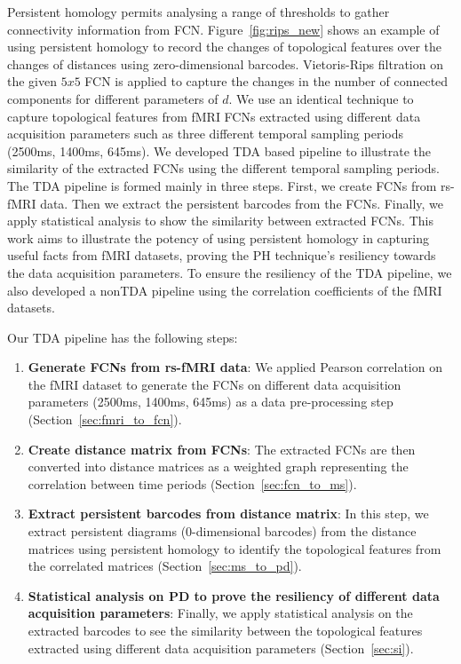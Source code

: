Persistent homology permits analysing a range of thresholds to gather connectivity information from FCN. Figure~\ref{fig:rips_new} shows an example of using persistent homology to record the changes of topological features over the changes of distances using zero-dimensional barcodes. Vietoris-Rips filtration on the given $5 x 5$ FCN is applied to capture the changes in the number of connected components for different parameters of $d$. We use an identical technique to capture topological features from fMRI FCNs extracted using different data acquisition parameters such as three different temporal sampling periods (2500ms, 1400ms, 645ms). We developed TDA based pipeline to illustrate the similarity of the extracted FCNs using the different temporal sampling periods. The TDA pipeline is formed mainly in three steps. First, we create FCNs from rs-fMRI data. Then we extract the persistent barcodes from the FCNs. Finally, we apply statistical analysis to show the similarity between extracted FCNs. This work aims to illustrate the potency of using persistent homology in capturing useful facts from fMRI datasets, proving the PH technique's resiliency towards the data acquisition parameters. To ensure the resiliency of the TDA pipeline, we also developed a nonTDA pipeline using the correlation coefficients of the fMRI datasets. 

Our TDA pipeline has the following steps:

\begin{enumerate}
    \item \textbf{Generate FCNs from rs-fMRI data}: We applied Pearson correlation on the fMRI dataset to generate the FCNs on different data acquisition parameters (2500ms, 1400ms, 645ms) as a data pre-processing step (Section~\ref{sec:fmri_to_fcn}).
    \item \textbf{Create distance matrix from FCNs}: The extracted FCNs are then converted into distance matrices as a weighted graph representing the correlation between time periods (Section~\ref{sec:fcn_to_ms}).
    \item \textbf{Extract persistent barcodes from distance matrix}: In this step, we extract persistent diagrams (0-dimensional barcodes) from the distance matrices using persistent homology to identify the topological features from the correlated matrices (Section~\ref{sec:ms_to_pd}).
    \item \textbf{Statistical analysis on PD to prove the resiliency of different data acquisition parameters}: Finally, we apply statistical analysis on the extracted barcodes to see the similarity between the topological features extracted using different data acquisition parameters (Section~\ref{sec:si}).
\end{enumerate}


